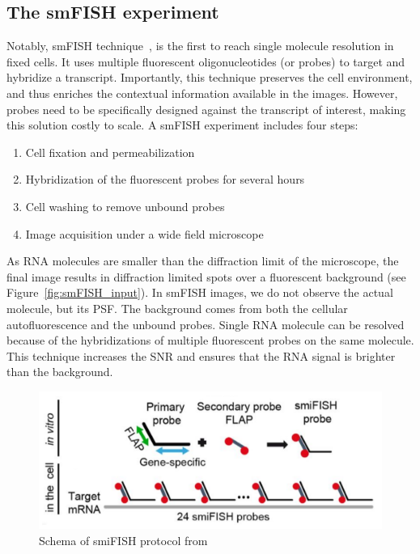 \subsection{The smFISH experiment}
\label{subsec:intro_smfish}

Notably, \ac{smFISH} technique~\cite{Femino_1998}, is the first to reach single molecule resolution in fixed cells.
It uses multiple fluorescent oligonucleotides (or probes) to target and hybridize a transcript.
Importantly, this technique preserves the cell environment, and thus enriches the contextual information available in the images.
However, probes need to be specifically designed against the transcript of interest, making this solution costly to scale.
A \ac{smFISH} experiment includes four steps:

\begin{enumerate}
	\setlength\itemsep{0.1em}
	\item Cell fixation and permeabilization
	\item Hybridization of the fluorescent probes for several hours
	\item Cell washing to remove unbound probes
	\item Image acquisition under a wide field microscope
\end{enumerate}

\noindent
As \ac{RNA} molecules are smaller than the diffraction limit of the microscope, the final image results in diffraction limited spots over a fluorescent background (see Figure~\ref{fig:smFISH_input}).
In \ac{smFISH} images, we do not observe the actual molecule, but its \ac{PSF}.
The background comes from both the cellular autofluorescence and the unbound probes.
Single \ac{RNA} molecule can be resolved because of the hybridizations of multiple fluorescent probes on the same molecule.
This technique increases the \ac{SNR} and ensures that the \ac{RNA} signal is brighter than the background.

\begin{figure}
	\begin{center}
	\includegraphics[width=\linewidth]{figures/introduction/smiFISH}
	\caption[Schema of smiFISH protocol]{Schema of smiFISH protocol from~\cite{tsanov_smifish_2016}}
	\label{fig:smiFISH}
	\end{center}
\end{figure}

